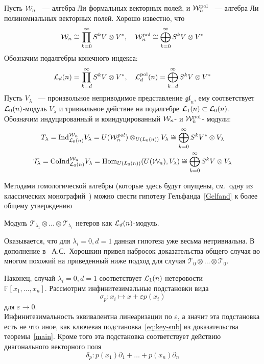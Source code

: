 Пусть $\mathcal{W}_n$ ~--- алгебра Ли формальных векторных полей, и $\mathcal{W}^{\mathrm{pol}}_n$ ~--- алгебра Ли полиномиальных векторных полей.
Хорошо известно, что
\[
    \mathcal{W}_n \cong \prod\limits_{k=0}^{\infty} S^k V\otimes V^*, \quad \mathcal{W}^{\mathrm{pol}}_n \cong \bigoplus\limits_{k=0}^{\infty} S^k V\otimes V^*
\]
Обозначим подалгебры конечного индекса:
\[
    \mathcal{L}_d(n) = \prod\limits_{k=d}^{\infty} S^k V\otimes V^*, \quad \mathcal{L}^{\mathrm{pol}}_d(n) = \bigoplus\limits_{k=d}^{\infty} S^k V\otimes V^*
\]
Пусть $V_{\lambda}$ ~--- произвольное неприводимое представление $\mathfrak{gl}_n$, ему соответствует $\mathcal{L}_0(n)$-модуль $V_{\lambda}$ и тривиальное действие на подалгебре $\mathcal{L}_1(n)\subset\mathcal{L}_0(n)$.
Обозначим индуцированный и коиндуцированный $\mathcal{W}_n$- и $\mathcal{W}^{\mathrm{pol}}_n$- модули:
\begin{gather*}
    T_{\lambda} = \mathrm{Ind}^{\mathcal{W}_n}_{\mathcal{L}_0(n)} V_{\lambda} = U(\mathcal{W}_n^{pol}) \otimes_{U(L_0(n))} V_{\lambda} \cong \bigoplus_{k=0}^{\infty} S^k V^*\otimes V_{\lambda} \\
    \mathcal{T}_{\lambda} = \mathrm{CoInd}^{\mathcal{W}_n}_{\mathcal{L}_0(n)} V_{\lambda} = \operatorname{Hom}_{U(L_0(n))}(U(\mathcal{W}_n), V_{\lambda}) \cong \bigoplus_{k=0}^{\infty} S^k V\otimes V_{\lambda}
\end{gather*}

Методами гомологической алгебры (которые здесь будут опущены, см.\ одну из классических монографий~\cite{Fuks}) можно свести гипотезу Гельфанда~\ref{Gelfand} к более общему утверждению

\vskip 0.1in\noindent
\begin{conjecture}
    Модуль $\mathcal{T}_{\lambda_1}\otimes\ldots\otimes\mathcal{T}_{\lambda_r}$ нетеров как $\mathcal{L}_d(n)$-модуль.
\end{conjecture}
\vskip 0.1in\noindent

Оказывается, что для $\lambda_i=0, d=1$ данная гипотеза уже весьма нетривиальна.
В дополнение в~\cite{Feigin-Kanel-Khoroshkin} А.С.\ Хорошкин привел набросок доказательства общего случая во многом похожий на приведенный ниже подход для случая $\mathcal{T}_{0}\otimes\ldots\otimes\mathcal{T}_{0}$.

Наконец, случай $\lambda_i=0, d=1$ соответствует $\mathcal{L}_1(n)$-нетеровости \\$\mathbb{F}[x_1, \ldots, x_n]$.
Рассмотрим инфинитезимальные подстановки вида
\[
    \sigma_p: x_i \mapsto x + \varepsilon p(x_i)
\]
для $\varepsilon\to 0$.\\
Инфинитезимальность эквивалентна линеаризации по $\varepsilon$, а значит эта подстановка есть не что иное, как ключевая подстановка~\ref{eq:key-sub} из доказательства теоремы~\ref{main}.
Кроме того эта подстановка соответствует действию диагонального векторного поля
\[
    \delta_p: p(x_1)\partial_1 + \ldots + p(x_n)\partial_n
\]

